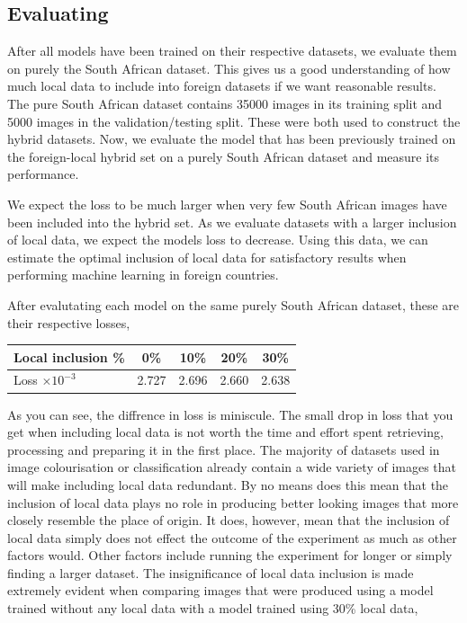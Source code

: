 \documentclass[conference]{IEEEtran}
\begin{document}

\subsection{Evaluating}

After all models have been trained on their respective datasets, we evaluate them on purely the South African dataset. This gives us a good understanding of how much local data to include into foreign datasets if we want reasonable results. The pure South African dataset contains 35000 images in its training split and 5000 images in the validation/testing split. These were both used to construct the hybrid datasets. Now, we evaluate the model that has been previously trained on the foreign-local hybrid set on a purely South African dataset and measure its performance.

We expect the loss to be much larger when very few South African images have been included into the hybrid set. As we evaluate datasets with a larger inclusion of local data, we expect the models loss to decrease. Using this data, we can estimate the optimal inclusion of local data for satisfactory results when performing machine learning in foreign countries.

After evalutating each model on the same purely South African dataset, these are their respective losses,

\begin{table}[h]
\centering
\renewcommand{\arraystretch}{1.5}
\begin{tabular}{|l||c|c|c|c|}
\hline 
Local inclusion \% & 0\% & 10\% & 20\% & 30\%  \\
\hline
Loss $\times 10^{-3}$& 2.727 & 2.696 & 2.660 & 2.638\\ 
\hline 
\end{tabular} 
\end{table}



As you can see, the diffrence in loss is miniscule. The small drop in loss that you get when including local data is not worth the time and effort spent retrieving, processing and preparing it in the first place. The majority of datasets used in image colourisation or classification already contain a wide variety of images that will make including local data redundant. By no means does this mean that the inclusion of local data plays no role in producing better looking images that more closely resemble the place of origin. It does, however, mean that the inclusion of local data simply does not effect the outcome of the experiment as much as other factors would. Other factors include running the experiment for longer or simply finding a larger dataset. The insignificance of local data inclusion is made extremely evident when comparing images that were produced using a model trained without any local data with a model trained using 30\% local data,
\end{document}
